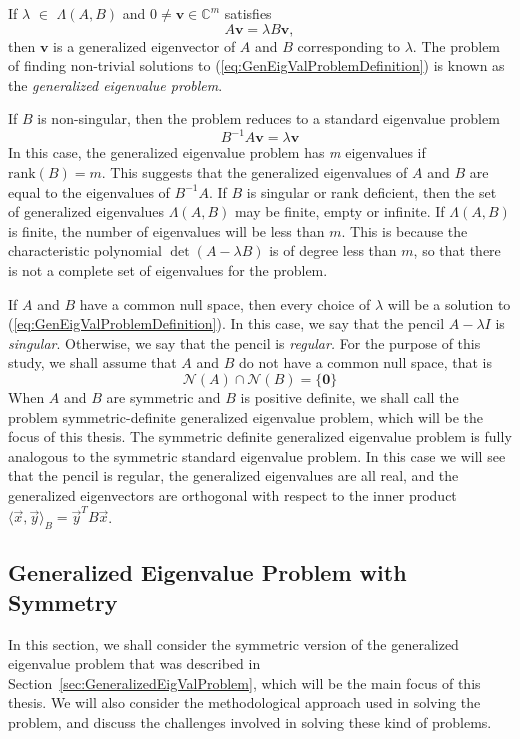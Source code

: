 If $\lambda$ $\in$ $\Lambda(A, B)$ and $0 \neq \mathbf{v} \in \mathbb{C}^m$ satisfies
\begin{equation}\label{eq:GenEigValProblemDefinition}
	A\mathbf{v} = \lambda B\mathbf{v},
\end{equation}
then $\mathbf{v}$ is a generalized eigenvector of $A$ and $B$ corresponding to $\lambda$. The problem of finding non-trivial solutions to (\ref{eq:GenEigValProblemDefinition}) is known as the \textit{generalized eigenvalue problem}.

If $B$ is non-singular, then the problem reduces to a standard eigenvalue problem
\begin{equation}\label{eq:StandardReduction}
	B^{-1}A \mathbf{v} = \lambda \mathbf{v}
\end{equation}
In this case, the generalized eigenvalue problem has \textit{m} eigenvalues if $\text{rank}(B) = m$. This suggests that the generalized eigenvalues of $A$ and $B$ are equal to the eigenvalues of $B^{-1}A$. If $B$ is singular or rank deficient, then the set of generalized eigenvalues $\Lambda(A, B)$ may be finite, empty or infinite. If $\Lambda(A, B)$ is finite, the number of eigenvalues will be less than $m$. This is because the characteristic polynomial $\det(A- \lambda B)$ is of degree less than $m$, so that there is not a complete set of eigenvalues for the problem.

If $A$ and $B$ have a common null space, then every choice of $\lambda$ will be a solution to (\ref{eq:GenEigValProblemDefinition}). In this case, we say that the pencil $A-\lambda I$ is {\em singular}.  Otherwise, we say that the pencil is {\em regular.}   For the purpose of this study, we shall assume that $A$ and $B$ do not have a common null space, that is
\begin{equation}\label{eq:EmptyCommonNullSpace}
	\mathcal{N}(A) \cap \mathcal{N}(B) = \{\mathbf{0} \}
\end{equation}
When $A$ and $B$ are symmetric and $B$ is positive definite, we shall call the problem symmetric-definite generalized eigenvalue problem, which will be the focus of this thesis. The symmetric definite generalized eigenvalue problem is fully analogous to the symmetric standard eigenvalue problem.  In this case we will see that the pencil is regular, the generalized eigenvalues are all real, and the generalized eigenvectors are orthogonal with respect to the inner product $\langle\vec{x}, \vec{y}\rangle_B = \vec{y}^T B \vec{x}$.

\subsection{Generalized Eigenvalue Problem with Symmetry}\label{sec:ProblemDiscussion}
In this section, we shall consider the symmetric version of the generalized eigenvalue problem that was described in Section~\ref{sec:GeneralizedEigValProblem}, which will be the main focus of this thesis. We will also consider the methodological approach used in solving the problem, and discuss the challenges involved in solving these kind of problems.

